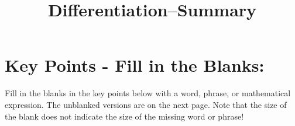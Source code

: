 \documentclass{article}
\begin{document}
\title{Differentiation--Summary}
\date{}

\maketitle
\thispagestyle{empty}
\pagestyle{empty}

\Large


\section{Key Points - Fill in the Blanks:}

Fill in the blanks in the key points below with a word, phrase, or mathematical expression. The unblanked versions are on the next page. Note that the size of the blank does not indicate the size of the missing word or phrase!
\end{document}
